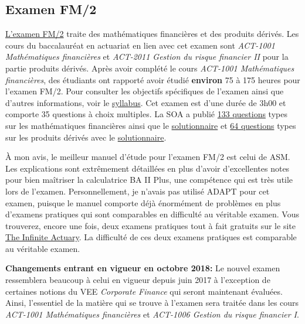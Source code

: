 \subsection*{Examen FM/2}
\label{subsec:examfm}
\href{https://www.soa.org/education/exam-req/edu-exam-fm-detail.aspx}{L'examen FM/2} traite des mathématiques financières et des produits dérivés. Les cours du baccalauréat en actuariat en lien avec cet examen sont \textit{ACT-1001 Mathématiques financières} et \textit{ACT-2011 Gestion du risque financier II} pour la partie produits dérivés. Après avoir complété le cours \textit{ACT-1001 Mathématiques financières}, des étudiants ont rapporté avoir étudié \textbf{environ} 75 à 175 heures pour l'examen FM/2. Pour consulter les objectifs spécifiques de l'examen ainsi que d'autres informations, voir le \href{https://www.soa.org/Files/Edu/2017/edu-2017-02-exam-fm-syllabus.pdf}{syllabus}. Cet examen est d'une durée de 3h00 et comporte 35 questions à choix multiples. La SOA a publié \href{https://www.soa.org/Files/Edu/2015/edu-2015-exam-fm-ques-theory.pdf}{133 questions} types sur les mathématiques financières ainsi que le \href{https://www.soa.org/Files/Edu/2015/edu-2015-exam-fm-sol-theory.pdf}{solutionnaire} et \href{https://www.soa.org/Files/Edu/edu-2014-10-exam-fm-ques.pdf}{64 questions} types sur les produits dérivés avec le \href{https://www.soa.org/Files/Edu/edu-2014-10-exam-fm-sol.pdf}{solutionnaire}.\vspace{\baselineskip} 

À mon avis, le meilleur manuel d'étude pour l'examen FM/2 est celui de ASM. Les explications sont extrêmement détaillées en plus d'avoir d'excellentes notes pour bien maîtriser la calculatrice BA II Plus, une compétence qui est très utile lors de l'examen. Personnellement, je n'avais pas utilisé ADAPT pour cet examen, puisque le manuel comporte déjà énormément de problèmes en plus d'examens pratiques qui sont comparables en difficulté au véritable examen. Vous trouverez, encore une fois, deux examens pratiques tout à fait gratuits sur le site \href{http://www.theinfiniteactuary.com/exams/2}{The Infinite Actuary}. La difficulté de ces deux examens pratiques est comparable au véritable examen.\vspace{\baselineskip} 

\textbf{Changements entrant en vigueur en octobre 2018:} Le nouvel examen ressemblera beaucoup à celui en vigueur depuis juin 2017 à l'exception de certaines notions du VEE \textit{Corporate Finance} qui seront maintenant évaluées. Ainsi, l'essentiel de la matière qui se trouve à l'examen sera traitée dans les cours \textit{ACT-1001 Mathématiques financières} et \textit{ACT-1006 Gestion du risque financier I}.



